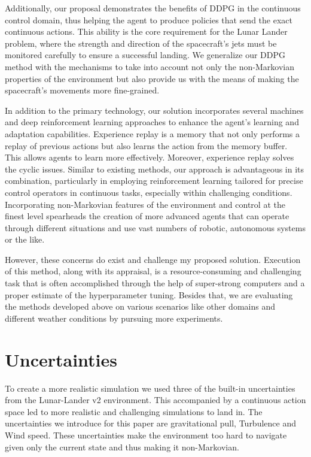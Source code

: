 \documentclass[conference]{IEEEtran}
\begin{document}
Additionally, our proposal demonstrates the benefits of DDPG in the continuous control domain, thus helping the agent to produce policies that send the exact continuous actions. This ability is the core requirement for the Lunar Lander problem, where the strength and direction of the spacecraft's jets must be monitored carefully to ensure a successful landing\cite{hossny2021refined}. We generalize our DDPG method with the mechanisms to take into account not only the non-Markovian properties of the environment but also provide us with the means of making the spacecraft's movements more fine-grained.

In addition to the primary technology, our solution incorporates several machines and deep reinforcement learning approaches to enhance the agent's learning and adaptation capabilities. Experience replay is a memory that not only performs a replay of previous actions but also learns the action from the memory buffer. This allows agents to learn more effectively. Moreover, experience replay solves the cyclic issues. Similar to existing methods, our approach is advantageous in its combination, particularly in employing reinforcement learning tailored for precise control operators in continuous tasks, especially within challenging conditions\cite{liu2018effects}. Incorporating non-Markovian features of the environment and control at the finest level spearheads the creation of more advanced agents that can operate through different situations and use vast numbers of robotic, autonomous systems or the like. 

However, these concerns do exist and challenge my proposed solution. Execution of this method, along with its appraisal, is a resource-consuming and challenging task that is often accomplished through the help of super-strong computers and a proper estimate of the hyperparameter tuning. Besides that, we are evaluating the methods developed above on various scenarios like other domains and different weather conditions by pursuing more experiments.

\section{Uncertainties}
To create a more realistic simulation we used three of the built-in uncertainties from the Lunar-Lander v2 environment. This accompanied by a continuous action space led to more realistic and challenging simulations to land in. The uncertainties we introduce for this paper are gravitational pull, Turbulence and Wind speed. These uncertainties make the environment too hard to navigate given only the current state and thus making it non-Markovian.
\end{document}
